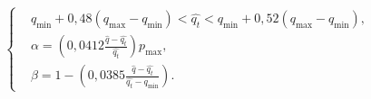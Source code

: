\begin{equation}
\label{fared2}
\left\{
  \begin{aligned}
    & q_{\min}+0,48\left(q_{\max}-q_{\min}\right) < \hat{q_t} < q_{\min}+0,52\left(q_{\max}-q_{\min}\right), \\
    & \alpha=\left(0,0412\frac{\hat{q}-\hat{q_t}}{\hat{q_t}} \right)p_{\max}, \\ 
    & \beta=1-\left(0,0385\frac{\hat{q}-\hat{q_t}}{\hat{q_t}-q_{\min}}\right).
  \end{aligned}
\right.
\end{equation}


